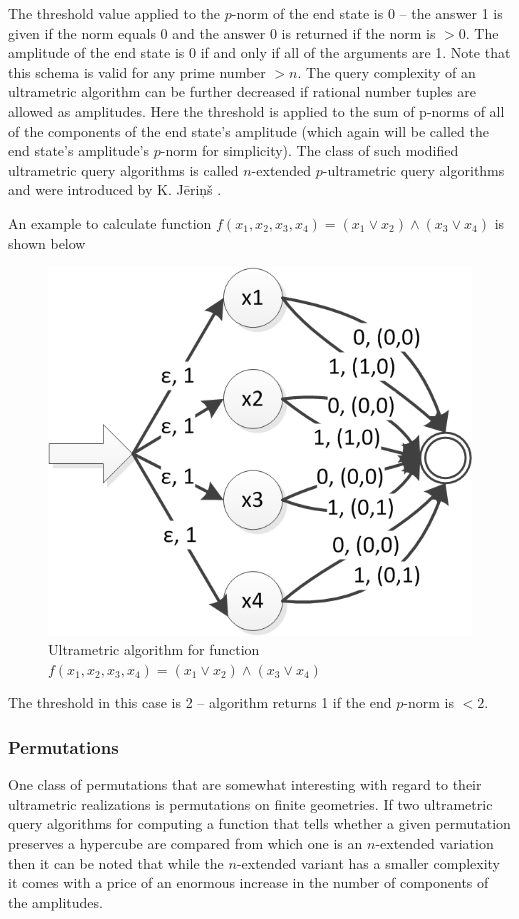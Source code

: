 \documentclass{llncs}
\begin{document}
The threshold value applied to the $p$-norm of the end state is 0 – the answer 1 is given if the norm equals 0 and the answer 0 is returned if the norm is $>0$. The amplitude of the end state is 0 if and only if all of the arguments are 1. Note that this schema is valid for any prime number $>n$. The query complexity of an ultrametric algorithm can be further decreased if rational number tuples are allowed as amplitudes. Here the threshold is applied to the sum of p-norms of all of the components of the end state's amplitude (which again will be called the end state's amplitude's $p$-norm for simplicity). The class of such modified ultrametric query algorithms is called $n$-extended $p$-ultrametric query algorithms and were introduced by K. J\= eri\c n\v s \cite{Jer12}.

An example to calculate function $f(x_1,x_2,x_3,x_4)=(x_1\vee x_2)\wedge (x_3\vee x_4)$ is shown below %

\begin{figure}
	\centering
	\includegraphics{or_and_or.png}
	\caption{Ultrametric algorithm for function $f(x_1,x_2,x_3,x_4 )=(x_1\vee x_2 )\wedge (x_3\vee x_4 )$}
	  \label{or_and_or}
\end{figure}

The threshold in this case is 2 – algorithm returns 1 if the end $p$-norm is $<2$.

\subsubsection{Permutations}
One class of permutations that are somewhat interesting with regard to their ultrametric realizations is permutations on finite geometries. If two ultrametric query algorithms for computing a function that tells whether a given permutation preserves a hypercube are compared from which one is an $n$-extended variation then it can be noted that while the $n$-extended variant has a smaller complexity it comes with a price of an enormous increase in the number of components of the amplitudes.
\end{document}
